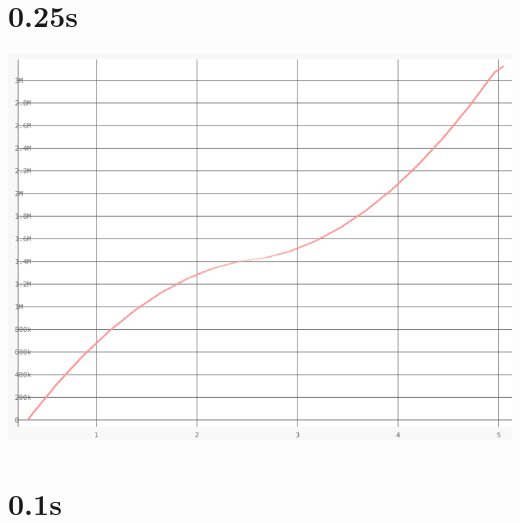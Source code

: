 \documentclass{article}
\begin{document}
\section{0.25s}
    \noindent\begin{minipage}{.45\textwidth}
    
    \end{minipage}\hfill
    \begin{minipage}{.45\textwidth}
    
    \end{minipage}
    
    \begin{center}
    \includegraphics[angle=90]{set_a_0.25s/set_a_0_25s.png}
    \end{center}
\clearpage

\section{0.1s}
    \noindent\begin{minipage}{.45\textwidth}
    
    \end{minipage}\hfill
    \begin{minipage}{.45\textwidth}
    
    \end{minipage}
    
\end{document}
